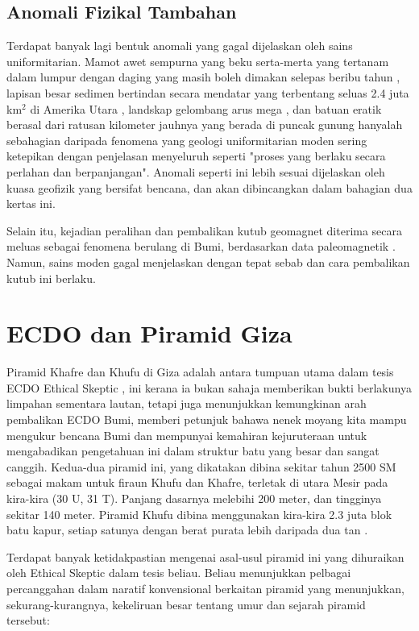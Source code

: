\documentclass[10pt,twocolumn,letterpaper]{article}
\begin{document}
\subsection{Anomali Fizikal Tambahan}

Terdapat banyak lagi bentuk anomali yang gagal dijelaskan oleh sains uniformitarian. Mamot awet sempurna yang beku serta-merta yang tertanam dalam lumpur dengan daging yang masih boleh dimakan selepas beribu tahun \cite{17,18,19}, lapisan besar sedimen bertindan secara mendatar yang terbentang seluas 2.4 juta km$^2$ di Amerika Utara \cite{21}, landskap gelombang arus mega \cite{22}, dan batuan eratik berasal dari ratusan kilometer jauhnya yang berada di puncak gunung \cite{23,26} hanyalah sebahagian daripada fenomena yang geologi uniformitarian moden sering ketepikan dengan penjelasan menyeluruh seperti "proses yang berlaku secara perlahan dan berpanjangan". Anomali seperti ini lebih sesuai dijelaskan oleh kuasa geofizik yang bersifat bencana, dan akan dibincangkan dalam bahagian dua kertas ini.

Selain itu, kejadian peralihan dan pembalikan kutub geomagnet diterima secara meluas sebagai fenomena berulang di Bumi, berdasarkan data paleomagnetik \cite{35,40,41}. Namun, sains moden gagal menjelaskan dengan tepat sebab dan cara pembalikan kutub ini berlaku.

\section{ECDO dan Piramid Giza}

Piramid Khafre dan Khufu di Giza adalah antara tumpuan utama dalam tesis ECDO Ethical Skeptic \cite{27}, ini kerana ia bukan sahaja memberikan bukti berlakunya limpahan sementara lautan, tetapi juga menunjukkan kemungkinan arah pembalikan ECDO Bumi, memberi petunjuk bahawa nenek moyang kita mampu mengukur bencana Bumi dan mempunyai kemahiran kejuruteraan untuk mengabadikan pengetahuan ini dalam struktur batu yang besar dan sangat canggih. Kedua-dua piramid ini, yang dikatakan dibina sekitar tahun 2500 SM sebagai makam untuk firaun Khufu dan Khafre, terletak di utara Mesir pada kira-kira (30 U, 31 T). Panjang dasarnya melebihi 200 meter, dan tingginya sekitar 140 meter. Piramid Khufu dibina menggunakan kira-kira 2.3 juta blok batu kapur, setiap satunya dengan berat purata lebih daripada dua tan \cite{24, 25}.

Terdapat banyak ketidakpastian mengenai asal-usul piramid ini yang dihuraikan oleh Ethical Skeptic dalam tesis beliau. Beliau menunjukkan pelbagai percanggahan dalam naratif konvensional berkaitan piramid yang menunjukkan, sekurang-kurangnya, kekeliruan besar tentang umur dan sejarah piramid tersebut:
\end{document}
